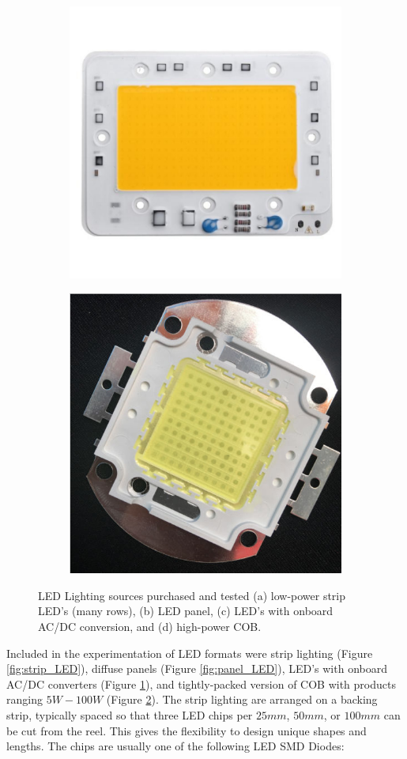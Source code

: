 \documentclass[fleqn,twoside,12pt]{report}
\begin{document}
\begin{figure}[h]
	\begin{subfigure}{.5\textwidth}
		\centering
		\includegraphics[width=.7\linewidth]{ac_LED.jpg}
		\caption{}
		\label{fig:ac_LED}
	\end{subfigure}%
	\begin{subfigure}{.5\textwidth}
		\centering
		\includegraphics[width=0.6\linewidth]{LED_vis.png}
		\caption{}
		\label{fig:LED_vis}
	\end{subfigure}%
	\caption{LED Lighting sources purchased and tested (a) low-power strip LED's (many rows), (b) LED panel, (c) LED's with onboard AC/DC conversion, and (d) high-power COB.}
	\label{}
\end{figure}


Included in the experimentation of LED formats were strip lighting (Figure \ref{fig:strip_LED}), diffuse panels (Figure \ref{fig:panel_LED}), LED's with onboard AC/DC converters (Figure \ref{fig:ac_LED}), and tightly-packed version of COB with products ranging $5W-100W$ (Figure \ref{fig:LED_vis}). The strip lighting are arranged on a backing strip, typically spaced so that three LED chips per $25mm$, $50mm$, or $100mm$ can be cut from the reel. This gives the flexibility to design unique shapes and lengths. The chips are usually one of the following LED SMD Diodes:
\end{document}
